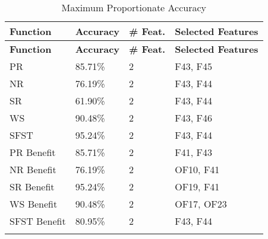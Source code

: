 \begin{longtable}{|p{3cm}|p{2cm}|p{2cm}|p{8cm}|}
\hline
\textbf{Function} & \textbf{Accuracy} & \textbf{\# Feat.} & \textbf{Selected Features} \\ \hline
\endfirsthead
\hline
\textbf{Function} & \textbf{Accuracy} & \textbf{\# Feat.} & \textbf{Selected Features} \\ \hline
\endhead

PR & 85.71\% & 2 & F43, F45 \\ \hline
NR & 76.19\% & 2 & F43, F44 \\ \hline
SR & 61.90\% & 2 & F43, F44 \\ \hline
WS & 90.48\% & 2 & F43, F46 \\ \hline
SFST & 95.24\% & 2 & F43, F44 \\ \hline
PR Benefit & 85.71\% & 2 & F41, F43 \\ \hline
NR Benefit & 76.19\% & 2 & OF10, F41 \\ \hline
SR Benefit & 95.24\% & 2 & OF19, F41 \\ \hline
WS Benefit & 90.48\% & 2 & OF17, OF23 \\ \hline
SFST Benefit & 80.95\% & 2 & F43, F44 \\ \hline
\caption{Maximum Proportionate Accuracy}
\label{tab_class_all:ensemble_prop_class_acc}
\end{longtable}